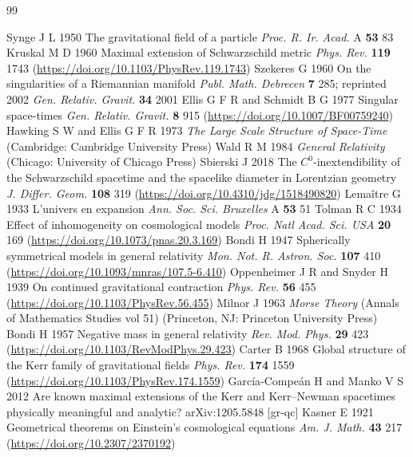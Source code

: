 \documentclass{iopjournal}
\theoremstyle{plain}
\theoremstyle{remark}
\begin{document}
\begin{thebibliography}{99}

 Synge J L 1950 The gravitational field of a particle \textit{Proc. R. Ir. Acad.} A \textbf{53} 83
 Kruskal M D 1960 Maximal extension of Schwarzschild metric \textit{Phys. Rev.} \textbf{119} 1743 (\href{https://doi.org/10.1103/PhysRev.119.1743}{https://doi.org/10.1103/PhysRev.119.1743})
 Szekeres G 1960 On the singularities of a Riemannian manifold \textit{Publ. Math. Debrecen} \textbf{7} 285; reprinted 2002 \textit{Gen. Relativ. Gravit.} \textbf{34} 2001
 Ellis G F R and Schmidt B G 1977 Singular space-times \textit{Gen. Relativ. Gravit.} \textbf{8} 915 (\href{https://doi.org/10.1007/BF00759240}{https://doi.org/10.1007/BF00759240})
 Hawking S W and Ellis G F R 1973 \textit{The Large Scale Structure of Space-Time} (Cambridge: Cambridge University Press)
 Wald R M 1984 \textit{General Relativity} (Chicago: University of Chicago Press)
 Sbierski J 2018 The $C^{0}$-inextendibility of the Schwarzschild spacetime and the spacelike diameter in Lorentzian geometry \textit{J. Differ. Geom.} \textbf{108} 319 (\href{https://doi.org/10.4310/jdg/1518490820}{https://doi.org/10.4310/jdg/1518490820})
 Lema\^itre G 1933 L'univers en expansion \textit{Ann. Soc. Sci. Bruxelles} A \textbf{53} 51
 Tolman R C 1934 Effect of inhomogeneity on cosmological models \textit{Proc. Natl Acad. Sci. USA} \textbf{20} 169 (\href{https://doi.org/10.1073/pnas.20.3.169}{https://doi.org/10.1073/pnas.20.3.169})
 Bondi H 1947 Spherically symmetrical models in general relativity \textit{Mon. Not. R. Astron. Soc.} \textbf{107} 410 (\href{https://doi.org/10.1093/mnras/107.5-6.410}{https://doi.org/10.1093/mnras/107.5-6.410})
 Oppenheimer J R and Snyder H 1939 On continued gravitational contraction \textit{Phys. Rev.} \textbf{56} 455 (\href{https://doi.org/10.1103/PhysRev.56.455}{https://doi.org/10.1103/PhysRev.56.455})
 Milnor J 1963 \textit{Morse Theory} (Annals of Mathematics Studies vol 51) (Princeton, NJ: Princeton University Press)
 Bondi H 1957 Negative mass in general relativity \textit{Rev. Mod. Phys.} \textbf{29} 423 (\href{https://doi.org/10.1103/RevModPhys.29.423}{https://doi.org/10.1103/RevModPhys.29.423})
 Carter B 1968 Global structure of the Kerr family of gravitational fields \textit{Phys. Rev.} \textbf{174} 1559 (\href{https://doi.org/10.1103/PhysRev.174.1559}{https://doi.org/10.1103/PhysRev.174.1559})
 Garc\'ia-Compe\'an H and Manko V S 2012 Are known maximal extensions of the Kerr and Kerr--Newman spacetimes physically meaningful and analytic? arXiv:1205.5848 [gr-qc]
 Kasner E 1921 Geometrical theorems on Einstein's cosmological equations \textit{Am. J. Math.} \textbf{43} 217 (\href{https://doi.org/10.2307/2370192}{https://doi.org/10.2307/2370192})

\end{thebibliography}
\end{document}

